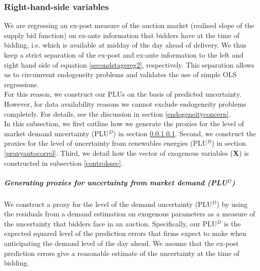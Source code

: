 \subsubsection{Right-hand-side variables}
\label{RHS}

We are regressing an ex-post measure of the auction market (realised slope of the supply bid function) on ex-ante information that bidders have at the time of bidding, i.e. which is available at midday of the day ahead of delivery.  
We thus keep a strict separation of the ex-post and  ex-ante information to the left  and right hand side of equation \ref{secondstagereg2}, respectively. This separation allows us to circumvent endogeneity problems and  validates the use of simple OLS regressions. \\

For this reason, we construct our PLUs on the basis of predicted uncertainty. However, for data availability reasons we cannot exclude endogeneity problems completely. For details, see the discussion in section \ref{endogeneityconcern}.  \\

In this subsection, we first outline how we generate the proxies for the level of market demand uncertainty (PLU$^D$) in section \ref{proxyunc}. Second, we construct the proxies for the level of uncertainty from renewables energies (PLU$^R$) in section \ref{proxyautocorrel}. Third, we detail how the vector of exogenous variables ($\boldsymbol{X}$) is constructed in subsection \ref{controlssec}.  \\


\subparagraph{Generating proxies for uncertainty from market demand (PLU$^D$)}
\label{proxyunc}

We construct a proxy for the level of the demand uncertainty (PLU$^{D}$) by using the residuals from a demand estimation on exogenous parameters as a measure of the uncertainty that bidders face in an auction. Specifically, our PLU$^D$ is the expected squared level of the prediction errors that firms expect to make when anticipating the demand level of the day ahead. We assume that the ex-post prediction errors give a reasonable estimate of the uncertainty at the time of bidding. \\




